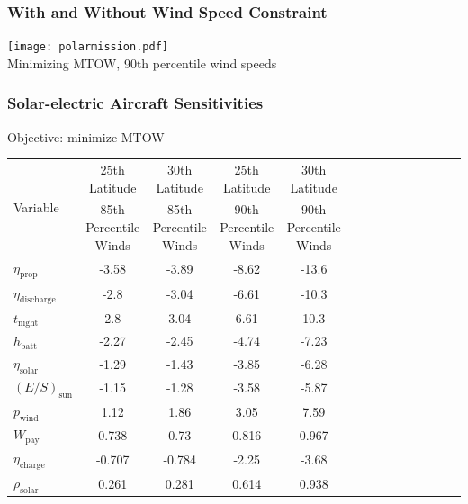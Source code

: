 \documentclass{beamer}
\begin{document}
\begin{frame}
    \frametitle{With and Without Wind Speed Constraint}

    \begin{center}
    \texttt{[image: polarmission.pdf]} \\
    Minimizing MTOW, 90th percentile wind speeds
    \end{center}

\end{frame}

\begin{frame}
    \frametitle{Solar-electric Aircraft Sensitivities}

    Objective: minimize MTOW
    \tiny
    \begin{longtable}{lccccccccccccc}
        \toprule
        \toprule
        \multirow{2}{*}{Variable}& 25th Latitude & 30th Latitude & 25th Latitude & 30th Latitude \\
                                 & 85th Percentile Winds & 85th Percentile Winds & 90th Percentile Winds & 90th Percentile Winds \\
        \midrule
        $\eta_{\text{prop}}$ &-3.58 & -3.89 & -8.62 & -13.6\\
        $\eta_{\text{discharge}}$ &-2.8 & -3.04 & -6.61 & -10.3\\
        $t_{\text{night}}$ &2.8 & 3.04 & 6.61 & 10.3\\
        $h_{\text{batt}}$ &-2.27 & -2.45 & -4.74 & -7.23\\
        $\eta_{\text{solar}}$ &-1.29 & -1.43 & -3.85 & -6.28\\
        $(E/S)_{\text{sun}}$ &-1.15 & -1.28 & -3.58 & -5.87\\
        $p_{\text{wind}}$ &1.12 & 1.86 & 3.05 & 7.59\\
        $W_{\text{pay}}$ &0.738 & 0.73 & 0.816 & 0.967\\
        $\eta_{\text{charge}}$ &-0.707 & -0.784 & -2.25 & -3.68\\
        $\rho_{\text{solar}}$ &0.261 & 0.281 & 0.614 & 0.938\\
        \bottomrule
    \end{longtable}

\end{frame}
\end{document}
